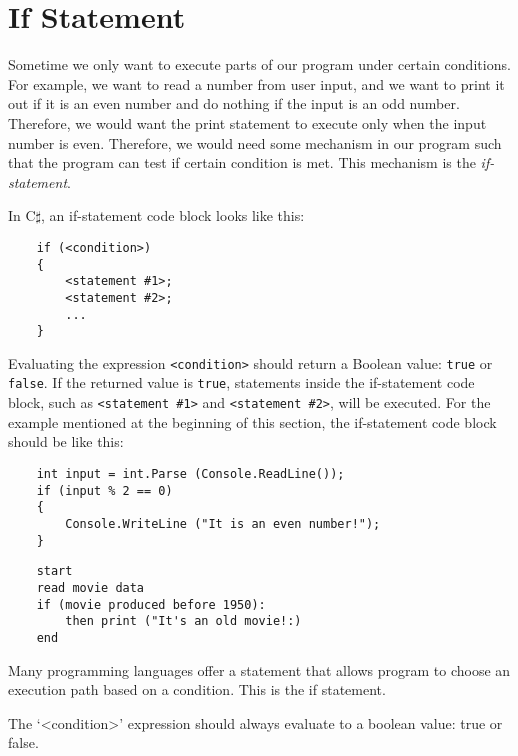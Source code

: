 \documentclass[../main.tex]{subfiles}
\begin{document}
\section{If Statement}
Sometime we only want to execute parts of our program under certain conditions.
For example, we want to read a number from user input, and we want to print it
out if it is an even number and do nothing if the input is an odd number. Therefore,
we would want the print statement to execute only when the input number is even.
Therefore, we would need some mechanism in our program such that the program can
test if certain condition is met. This mechanism is the \emph{if-statement}.

In C$\sharp$, an if-statement code block looks like this:
\begin{verbatim}
    if (<condition>)
    {
        <statement #1>;
        <statement #2>;
        ...
    }
\end{verbatim}

Evaluating the expression \texttt{<condition>} should return a Boolean value:
\texttt{true} or \texttt{false}. If the returned value is \texttt{true}, statements
inside the if-statement code block, such as \texttt{<statement \#1>} and
\texttt{<statement \#2>}, will be executed. For the example mentioned at the
beginning of this section, the if-statement code block should be like this:
\begin{verbatim}
    int input = int.Parse (Console.ReadLine());
    if (input % 2 == 0)
    {
        Console.WriteLine ("It is an even number!");
    }
\end{verbatim}

\begin{verbatim}
    start
    read movie data
    if (movie produced before 1950):
        then print ("It's an old movie!:)
    end
\end{verbatim}

Many programming languages offer a statement that allows program to choose an
execution path based on a condition. This is the if statement.






The `\textless condition\textgreater' expression should always evaluate to a
boolean value: true or false.
\end{document}
